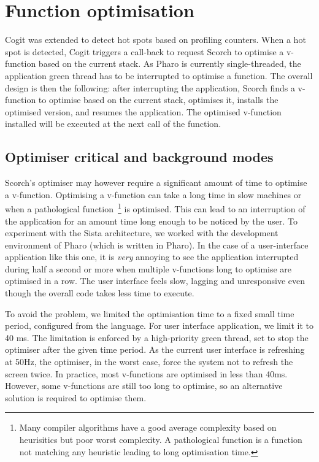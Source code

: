 \documentclass[a4paper,12pt,twoside]{../includes/ThesisStyle}
\begin{document}

\section{Function optimisation}
\label{sec:functionOptimisation}

Cogit was extended to detect hot spots based on profiling counters. When a hot spot is detected, Cogit triggers a call-back to request Scorch to optimise a v-function based on the current stack. As Pharo is currently single-threaded, the application green thread has to be interrupted to optimise a function. The overall design is then the following: after interrupting the application, Scorch finds a v-function to optimise based on the current stack, optimises it, installs the optimised version, and resumes the application. The optimised v-function installed will be executed at the next call of the function.

\subsection{Optimiser critical and background modes}

Scorch's optimiser may however require a significant amount of time to optimise a v-function. Optimising a v-function can take a long time in slow machines or when a pathological function~\footnote{Many compiler algorithms have a good average complexity based on heurisitics but poor worst complexity. A pathological function is a function not matching any heuristic leading to long optimisation time.} is optimised. This can lead to an interruption of the application for an amount time long enough to be noticed by the user. To experiment with the Sista architecture, we worked with the development environment of Pharo (which is written in Pharo). In the case of a user-interface application like this one, it is \emph{very} annoying to see the application interrupted during half a second or more when multiple v-functions long to optimise are optimised in a row. The user interface feels slow, lagging and unresponsive even though the overall code takes less time to execute.

To avoid the problem, we limited the optimisation time to a fixed small time period, configured from the language. For user interface application, we limit it to 40 ms. The limitation is enforced by a high-priority green thread, set to stop the optimiser after the given time period. As the current user interface is refreshing at 50Hz, the optimiser, in the worst case, force the system not to refresh the screen twice. In practice, most v-functions are optimised in less than 40ms. However, some v-functions are still too long to optimise, so an alternative solution is required to optimise them.
\end{document}

